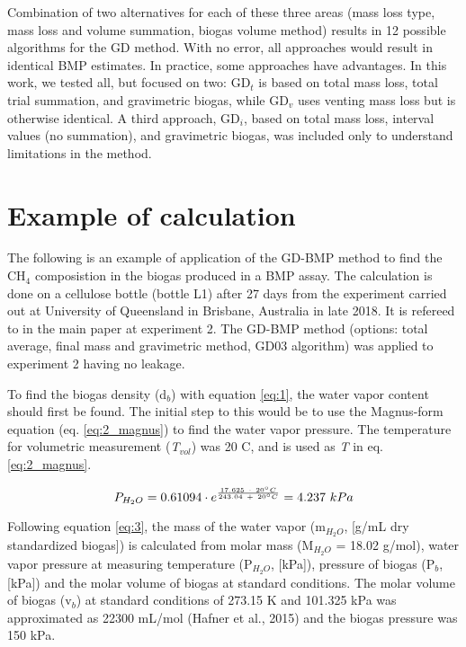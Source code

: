 \documentclass[]{article}
\begin{document}
Combination of two alternatives for each of these three areas (mass loss type, mass loss and volume summation, biogas volume method) results in 12 possible algorithms for the GD method. With no error, all approaches would result in identical BMP estimates. In practice, some approaches have advantages. In this work, we tested all, but focused on two: GD$_t$ is based on total mass loss, total trial summation, and gravimetric biogas, while GD$_v$ uses venting mass loss but is otherwise identical. A third approach, GD$_i$, based on total mass loss, interval values (no summation), and gravimetric biogas, was included only to understand limitations in the method.

\section{Example of calculation} \label{s_example}
The following is an example of application of the GD-BMP method to find the CH$_4$ composistion in the biogas produced in a BMP assay. The calculation is done on a cellulose bottle (bottle L1) after 27 days from the experiment carried out at University of Queensland in Brisbane, Australia in late 2018. It is refereed to in the main paper at experiment 2.
The GD-BMP method (options: total average, final mass and gravimetric method, GD03 algorithm) was applied to experiment 2 having no leakage.

To find the biogas density (d$_b$) with equation \ref{eq:1}, the water vapor content should first be found. The initial step to this would be to use the Magnus-form equation (eq. \ref{eq:2_magnus}) to find the water vapor pressure. The temperature for volumetric measurement (\textit{T}$_{vol}$) was 20 \degree C, and is used as \textit{T} in eq. \ref{eq:2_magnus}.

\begin{equation*}
\centering
   P_{H_2O} = 0.61094 \cdot e^{\frac{17.625\ \cdot\ 20 \degree C}{243.04\ +\ 20 \degree C}} = 4.237\ kPa
\end{equation*}

 

\noindent Following equation \ref{eq:3}, the mass of the water vapor (m$_{H_2O}$, [g/mL dry standardized biogas]) is calculated from molar mass (M$_{H_2O}$ = 18.02 g/mol), water vapor pressure at measuring temperature (P$_{H_2O}$, [kPa]), pressure of biogas (P$_b$, [kPa]) and the molar volume of biogas at standard conditions. The molar volume of biogas (v$_b$) at standard conditions of 273.15 \degree K and 101.325 kPa was approximated as 22300 mL/mol (Hafner et al., 2015) and the biogas pressure was 150 kPa.
\end{document}
